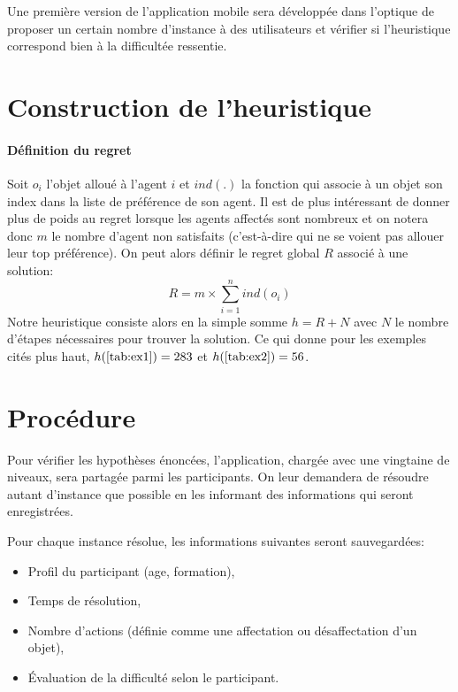 \documentclass[a4paper, 10pt]{article}
\begin{document}
	Une première version de l'application mobile sera développée dans l'optique de proposer un certain nombre d'instance à des utilisateurs et vérifier si l'heuristique correspond bien à la difficultée ressentie.
	
	\section*{Construction de l'heuristique}
	
	\paragraph{Définition du regret}{Soit $o_i$ l'objet alloué à l'agent $i$ et $ind(.)$ la fonction qui associe à un objet son index dans la liste de préférence de son agent. Il est de plus intéressant de donner plus de poids au regret lorsque les agents affectés sont nombreux et on notera donc $m$ le nombre d'agent non satisfaits (c'est-à-dire qui ne se voient pas allouer leur top préférence). On peut alors définir le regret global $R$ associé à une solution:
	\begin{equation*}
		R = m \times \sum_{i=1}^n ind(o_i)
	\end{equation*}	
	Notre heuristique consiste alors en la simple somme $h = R + N$ avec $N$ le nombre d'étapes nécessaires pour trouver la solution. Ce qui donne pour les exemples cités plus haut, $h(\ref{tab:ex1}) = 283$ et $h(\ref{tab:ex2}) = 56$.
	}
	
	\section*{Procédure}
	
	Pour vérifier les hypothèses énoncées, l'application, chargée avec une vingtaine de niveaux, sera partagée parmi les participants. On leur demandera de résoudre autant d'instance que possible en les informant des informations qui seront enregistrées.
	
	Pour chaque instance résolue, les informations suivantes seront sauvegardées:
	\begin{itemize}
		\item Profil du participant (age, formation),
		\item Temps de résolution,
		\item Nombre d'actions (définie comme une affectation ou désaffectation d'un objet),
		\item Évaluation de la difficulté selon le participant.
	\end{itemize}
	
\end{document}
